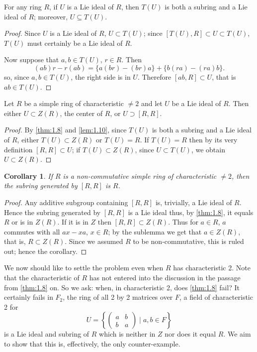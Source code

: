 \documentclass{article}
\newtheorem{corollary}[theorem]{Corollary}
\begin{document}
\begin{lemma}\label{lem:1.10}
For any ring $ R $, if $ U $ is a Lie ideal of $ R $, then $ T(U) $ is both a subring and a Lie ideal of $ R $; moreover, $U \subseteq T(U)$.  
\end{lemma}  

\begin{proof}  
Since $ U $ is a Lie ideal of $ R $, $U \subset T(U)$; since $[T(U), R] \subset U \subset T(U)$, $ T(U) $ must certainly be a Lie ideal of $ R $.  

Now suppose that $a, b \in T(U)$, $r \in R$. Then  
\[ (ab)r - r(ab) = \{a(br) - (br)a\} + \{b(ra) - (ra)b\}. \]  
so, since $a, b \in T(U)$, the right side is in $ U $. Therefore $[ab, R] \subset U$, that is $ab \in T(U)$.  
\end{proof}  

\begin{theorem}\label{thm:1.11}  
Let $R$ be a simple ring of characteristic $\neq 2$ and let $U$ be a Lie ideal of $R$. Then either $U \subset Z(R)$, the center of $R$, or $U \supset [R, R]$.  
\end{theorem}  

\begin{proof}  
By \ref{thm:1.8} and \ref{lem:1.10}, since $T(U)$ is both a subring and a Lie ideal of $R$, either $T(U) \subset Z(R)$ or $T(U) = R$. If $T(U) = R$ then by its very definition $[R, R] \subset U$; if $T(U) \subset Z(R)$, since $U \subset T(U)$, we obtain $U \subset Z(R)$.  
\end{proof}

\begin{corollary}\label{cor:1.12}  
If $R$ is a non-commutative simple ring of characteristic $\neq 2$, then the subring generated by $[R, R]$ is $R$.  
\end{corollary}  

\begin{proof}  
Any additive subgroup containing $[R, R]$ is, trivially, a Lie ideal of $R$. Hence the subring generated by $[R, R]$ is a Lie ideal thus, by \ref{thm:1.8}, it equals $R$ or is in $Z(R)$. If it is in $Z$ then $[R, R] \subset Z(R)$. Thus for $a \in R$, $a$ commutes with all $ax - xa$, $x \in R$; by the sublemma we get that $a \in Z(R)$, that is, $R \subset Z(R)$. Since we assumed $R$ to be non-commutative, this is ruled out; hence the corollary.  
\end{proof} 

We now should like to settle the problem even when $R$ has characteristic 2. Note that the characteristic of $R$ has not entered into the discussion in the passage from \ref{thm:1.8} on. So we ask: when, in characteristic 2, does \ref{thm:1.8} fail? It certainly fails in $F_2$, the ring of all 2 by 2 matrices over $F$, a field of characteristic 2 for   
\[   
U = \left\{ \begin{pmatrix} a & b \\ b & a \end{pmatrix} \mid a, b \in F \right\}   
\]   
is a Lie ideal and subring of $R$ which is neither in $Z$ nor does it equal $R$. We aim to show that this is, effectively, the only counter-example.  
\end{document}
